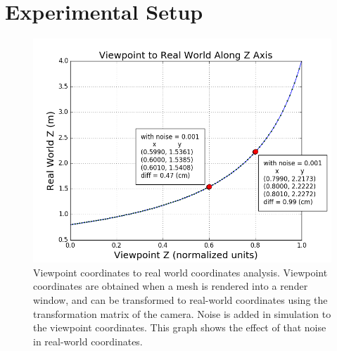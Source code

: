 \section{Experimental Setup}	\label{sec:related_works}

\begin{figure}[h]%
\centering
\includegraphics[width=.5\textwidth]{figures/plot_depth.png}
\caption{Viewpoint coordinates to real world coordinates analysis. Viewpoint coordinates are obtained when a mesh is rendered into a render window, and can be transformed to real-world coordinates using the transformation matrix of the camera. Noise is added in simulation to the viewpoint coordinates. This graph shows the effect of that noise in real-world coordinates.}
\label{fig:pipeline}
\end{figure}
